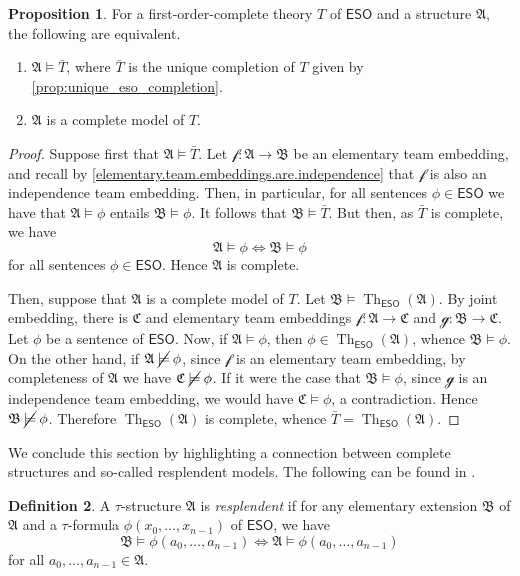 \documentclass[a4paper]{amsart}
\theoremstyle{definition}
\newtheorem{definition}{Definition}[section]
\newtheorem{proposition}[definition]{Proposition}
\theoremstyle{remark}
\newcommand{\A}{\mathcal{A}}
\newcommand{\B}{\mathcal{B}}
\newcommand{\C}{\mathcal{C}}
\newcommand\eso{\mathsf{ESO}}
\newcommand\nmodels{\mathbin{\cancel{\models}}}
\theoremstyle{definition}
\renewcommand{\A}{\mathfrak{A}}
\renewcommand{\B}{\mathfrak{B}}
\renewcommand{\C}{\mathfrak{C}}
\DeclareMathOperator{\Th}{Th}
\newcommand{\ESOTh}{\Th_{\eso}}
\newcommand{\f}{\mathcal{f}}
\newcommand{\g}{\mathcal{g}}
\begin{document}
\begin{proposition}\label{complete-theory-models}
    For a first-order-complete theory $T$ of $\eso$ and a structure $\A$, the following are equivalent.
    \begin{enumerate}
        \item $\A\models\bar T$, where $\bar T$ is the unique completion of $T$ given by \cref{prop:unique_eso_completion}.
        \item $\A$ is a complete model of $T$.
    \end{enumerate}
\end{proposition}
\begin{proof}
    Suppose first that $\A\models\bar T$. Let $\f\colon\A\to\B$ be an elementary team embedding, and recall by \cref{elementary.team.embeddings.are.independence} that $\f$ is also an independence team embedding. Then, in particular, for all sentences $\phi\in\eso$ we have that $\A\models\phi$ entails $\B\models\phi$. It follows that $\B\models\bar T$. But then, as $\bar T$ is complete, we have
    \[
        \A\models\phi \iff \B\models\phi
    \]
    for all sentences $\phi\in\eso$. Hence $\A$ is complete.

    Then, suppose that $\A$ is a complete model of $T$. Let $\B\models\ESOTh(\A)$. By joint embedding, there is $\C$ and elementary team embeddings $\f\colon\A\to\C$ and $\g\colon\B\to\C$. Let $\phi$ be a sentence of $\eso$. Now, if $\A\models\phi$, then $\phi\in\ESOTh(\A)$, whence $\B\models\phi$. On the other hand, if $\A\nmodels\phi$, since $\f$ is an elementary team embedding, by completeness of $\A$ we have $\C\nmodels\phi$. If it were the case that $\B\models\phi$, since $\g$ is an independence team embedding, we would have $\C\models\phi$, a contradiction. Hence $\B\nmodels\phi$. Therefore $\ESOTh(\A)$ is complete, whence $\bar T = \ESOTh(\A)$.
\end{proof}

We conclude this section by highlighting a connection between complete structures and so-called resplendent models. The following can be found in \cite[Ch.~9.3]{poizat2012course}.


\begin{definition}
    A $\tau$-structure $\A$ is \emph{resplendent} if
    for any elementary extension $\B$ of $\A$ and a $\tau$-formula $\phi(x_0,\dots,x_{n-1})$ of $\eso$, we have
    \[
        \B\models\phi(a_0,\dots,a_{n-1}) \iff \A\models\phi(a_0,\dots,a_{n-1})
    \]
    for all $a_0,\dots,a_{n-1}\in\A$.
\end{definition}
\end{document}
